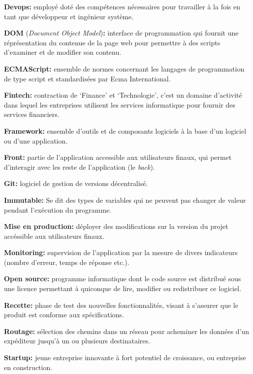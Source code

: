 \documentclass[12pt,a4paper]{article}
\begin{document}
  \bigskip

  \textbf{Devops:} employé doté des compétences nécessaires pour
  travailler à la fois en tant que développeur et ingénieur système.

  \bigskip

  \textbf{DOM} (\emph{Document Object Model})\textbf{:} interface de
  programmation qui fournit une réprésentation du contenue de la page web
  pour permettre à des scripts d'examiner et de modifier son contenu.

  \bigskip

  \textbf{ECMAScript:} ensemble de normes concernant les langages de
  programmation de type script et standardisées par Ecma International.

  \bigskip

  \textbf{Fintech:} contraction de `Finance' et `Technologie', c'est un
  domaine d'activité dans lequel les entreprises utilisent les services
  informatique pour fournir des services financiers.

  \bigskip

  \textbf{Framework:} ensemble d'outils et de composants logiciels à la
  base d'un logiciel ou d'une application.

  \bigskip

  \textbf{Front:} partie de l'application accessible aux utilisateurs
  finaux, qui permet d'interagir avec les reste de l'application (le
  \emph{back}).

  \bigskip

  \textbf{Git:} logiciel de gestion de versions décentralisé.

  \bigskip

  \textbf{Immutable:} Se dit des types de variables qui ne peuvent pas
  changer de valeur pendant l'exécution du programme.

  \bigskip

  \textbf{Mise en production:} déployer des modifications sur la version
  du projet accéssible aux utilisateurs finaux.

  \bigskip

  \textbf{Monitoring:} supervision de l'application par la mesure de
  divers indicateurs (nombre d'erreur, temps de réponse etc.).

  \bigskip

  \textbf{Open source:} programme informatique dont le code source est
  distribué sous une licence permettant à quiconque de lire, modifier ou
  redistribuer ce logiciel.

  \bigskip

  \textbf{Recette:} phase de test des nouvelles fonctionnalités, visant à
  s'assurer que le produit est conforme aux spécifications.

  \bigskip

  \textbf{Routage:} sélection des chemins dans un réseau pour acheminer
  les données d'un expéditeur jusqu'à un ou plusieurs destinataires.

  \bigskip

  \textbf{Startup:} jeune entreprise innovante à fort potentiel de
  croissance, ou entreprise en construction.



  \newpage

  \listoffigures
\end{document}
